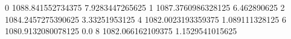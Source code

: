 0 1088.841552734375 7.9283447265625
1 1087.3760986328125 6.462890625
2 1084.2457275390625 3.33251953125
4 1082.0023193359375 1.089111328125
6 1080.9132080078125 0.0
8 1082.066162109375 1.1529541015625
